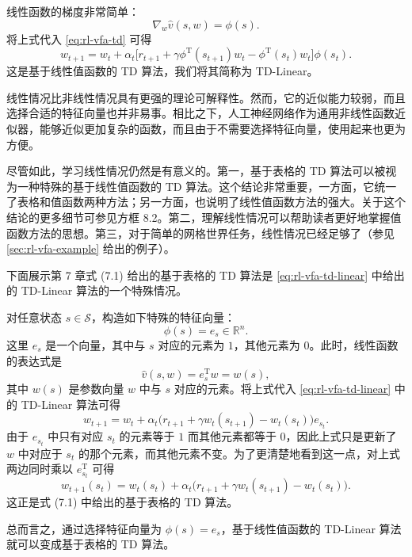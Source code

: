 线性函数的梯度非常简单：
\begin{equation*}
\nabla_{w} \hat{v}(s, w) = \phi(s).
\end{equation*}
将上式代入 \cref{eq:rl-vfa-td} 可得
\begin{equation}
w_{t+1} = w_{t} + \alpha_{t} \big[r_{t+1} + \gamma \phi^{\mathrm{T}}(s_{t+1}) w_{t} - \phi^{\mathrm{T}}(s_{t}) w_{t}\big] \phi(s_{t}).
\label{eq:rl-vfa-td-linear}
\end{equation}
这是基于线性值函数的 TD 算法，我们将其简称为 TD-Linear。

线性情况比非线性情况具有更强的理论可解释性。然而，它的近似能力较弱，而且选择合适的特征向量也并非易事。相比之下，人工神经网络作为通用非线性函数近似器，能够近似更加复杂的函数，而且由于不需要选择特征向量，使用起来也更为方便。

尽管如此，学习线性情况仍然是有意义的。第一，基于表格的 TD 算法可以被视为一种特殊的基于线性值函数的 TD 算法。这个结论非常重要，一方面，它统一了表格和值函数两种方法；另一方面，也说明了线性值函数方法的强大。关于这个结论的更多细节可参见方框 8.2。第二，理解线性情况可以帮助读者更好地掌握值函数方法的思想。第三，对于简单的网格世界任务，线性情况已经足够了（参见 \cref{sec:rl-vfa-example} 给出的例子）。

\begin{note}
下面展示第 7 章式 (7.1) 给出的基于表格的 TD 算法是 \cref{eq:rl-vfa-td-linear} 中给出的 TD-Linear 算法的一个特殊情况。

对任意状态 $s \in \mathcal{S}$，构造如下特殊的特征向量：
\begin{equation*}
\phi(s) = e_{s} \in \mathbb{R}^{n}.
\end{equation*}
这里 $e_{s}$ 是一个向量，其中与 $s$ 对应的元素为 $1$，其他元素为 $0$。此时，线性函数的表达式是
\begin{equation*}
\hat{v}(s, w) = e_{s}^{\mathrm{T}} w = w(s),
\end{equation*}
其中 $w(s)$ 是参数向量 $w$ 中与 $s$ 对应的元素。将上式代入 \cref{eq:rl-vfa-td-linear} 中的 TD-Linear 算法可得
\begin{equation*}
w_{t+1} = w_{t} + \alpha_{t} \big(r_{t+1} + \gamma w_{t}(s_{t+1}) - w_{t}(s_{t})\big) e_{s_{t}}.
\end{equation*}
由于 $e_{s_t}$ 中只有对应 $s_t$ 的元素等于 $1$ 而其他元素都等于 $0$，因此上式只是更新了 $w$ 中对应于 $s_t$ 的那个元素，而其他元素不变。为了更清楚地看到这一点，对上式两边同时乘以 $e_{s_t}^{\mathrm{T}}$ 可得
\begin{equation*}
w_{t+1}(s_{t}) = w_{t}(s_{t}) + \alpha_{t} \big(r_{t+1} + \gamma w_{t}(s_{t+1}) - w_{t}(s_{t})\big).
\end{equation*}
这正是式 (7.1) 中给出的基于表格的 TD 算法。

总而言之，通过选择特征向量为 $\phi(s) = e_s$，基于线性值函数的 TD-Linear 算法就可以变成基于表格的 TD 算法。
\end{note}

